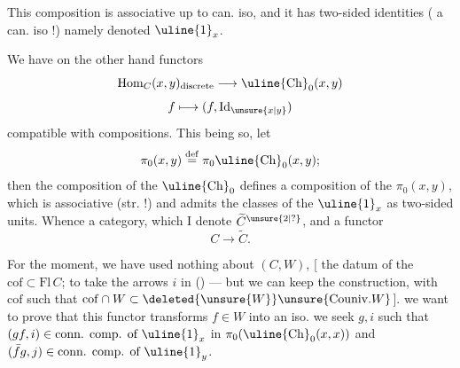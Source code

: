 This composition is associative up to can. iso, and it has two-sided identities ( a can. iso !) namely
 denoted $\uline{1}_x$.

We have on the other hand  functors
\[\operatorname{Hom}_C(x,y)_{\text{discrete}}\longrightarrow\uline{\mathrm{Ch}}_0(x,y)\]
\[f\longmapsto(f,\operatorname{Id}_{\unsure{x|y}})\]
compatible with compositions. This being so, let
\[\pi_0(x,y)\overset{\mathrm{def}}=\pi_0\uline{\mathrm{Ch}}_0(x,y);\]
then the composition of the $\uline{\mathrm{Ch}}_0$ defines a composition of the $\pi_0(x,y)$, which is associative (str. !) and admits the classes of the $\uline{1}_x$ as two-sided units. Whence a category, which I denote $\widetilde C^{\unsure{2|?}}$, and a functor
\[C\longrightarrow\widetilde C.\]

For the moment, we have used nothing about $(C,W)$, [  the datum of the $\mathrm{cof}\subset\mathrm{Fl}\,C$;  to take the arrows $i$ in () --- but  we can keep the construction, with $\mathrm{cof}$  such that $\mathrm{cof}\cap W\subset\deleted{\unsure{W}}\unsure{\mathrm{Couniv.}W}$].   we want to prove that this functor transforms $f\in W$ into an iso.
we seek $g,i$ such that $(gf,i)\in\text{conn. comp. of }\uline{1}_x$ in $\pi_0(\uline{\mathrm{Ch}}_0(x,x))$ and $(\bar f g,j)\in\text{conn. comp. of }\uline{1}_y$.
